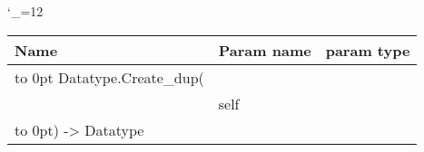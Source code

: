 \begingroup \catcode`\_=12 \tt
\begin{tabular}{lll}
\toprule
\textrm{Name}&\textrm{Param name}&\textrm{param type}\\
\midrule
\hbox to 0pt {Datatype.Create_dup(\hss}\\
& self\\
\hbox to 0pt{) -> Datatype\hss}\\
\bottomrule
\end{tabular}
\endgroup
